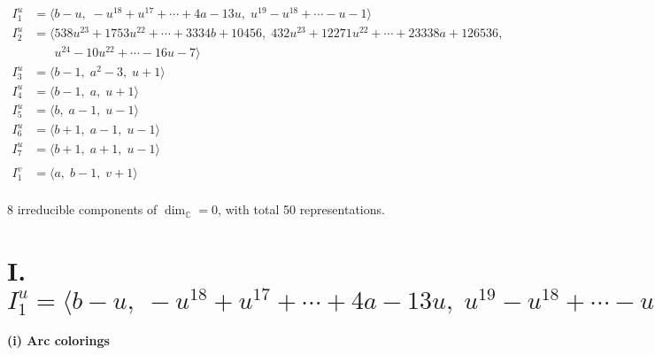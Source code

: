 \documentclass[1p]{elsarticle_modified}
\theoremstyle{definition}
\begin{document}
\begin{align*}
I^u_{1}&=\langle 
b- u,\;- u^{18}+u^{17}+\cdots+4 a-13 u,\;u^{19}- u^{18}+\cdots- u-1\rangle \\
I^u_{2}&=\langle 
538 u^{23}+1753 u^{22}+\cdots+3334 b+10456,\;432 u^{23}+12271 u^{22}+\cdots+23338 a+126536,\\
\phantom{I^u_{2}}&\phantom{= \langle  }u^{24}-10 u^{22}+\cdots-16 u-7\rangle \\
I^u_{3}&=\langle 
b-1,\;a^2-3,\;u+1\rangle \\
I^u_{4}&=\langle 
b-1,\;a,\;u+1\rangle \\
I^u_{5}&=\langle 
b,\;a-1,\;u-1\rangle \\
I^u_{6}&=\langle 
b+1,\;a-1,\;u-1\rangle \\
I^u_{7}&=\langle 
b+1,\;a+1,\;u-1\rangle \\
\\
I^v_{1}&=\langle 
a,\;b-1,\;v+1\rangle \\
\end{align*}
\raggedright * 8 irreducible components of $\dim_{\mathbb{C}}=0$, with total 50 representations.\\
\newpage
\renewcommand{\arraystretch}{1}
\centering \section*{I. $I^u_{1}= \langle b- u,\;- u^{18}+u^{17}+\cdots+4 a-13 u,\;u^{19}- u^{18}+\cdots- u-1 \rangle$}
\flushleft \textbf{(i) Arc colorings}\\
\end{document}
